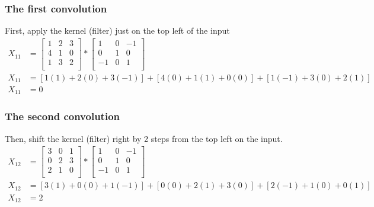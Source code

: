 \documentclass[12pt, a4paper]{article}
\begin{document}
                \subsubsection{The first convolution}
                    First, apply the kernel (filter) just on the top left of the input
                    \begin{align*}
                        {X}_{11} &=
                        \begin{bmatrix}
                            1 & 2 & 3 \\
                            4 & 1 & 0 \\
                            1 & 3 & 2 \\
                        \end{bmatrix}
                        \ast
                        \begin{bmatrix}
                            1  & 0 & -1 \\
                            0  & 1 & 0  \\
                            -1 & 0 & 1  \\
                        \end{bmatrix}
                        \\[1em]
                        {X}_{11} &= [1(1) + 2(0) + 3(-1)] + [4(0) + 1(1) + 0(0)] + [1(-1) + 3(0) + 2(1)] \\
                        {X}_{11} &= 0
                    \end{align*}

                \subsubsection{The second convolution}
                    Then, shift the kernel (filter) right by 2 steps from the top left on the input.
                    \begin{align*}
                        {X}_{12} &=
                        \begin{bmatrix}
                            3 & 0 & 1 \\
                            0 & 2 & 3 \\
                            2 & 1 & 0 \\
                        \end{bmatrix}
                        \ast
                        \begin{bmatrix}
                            1  & 0 & -1 \\
                            0  & 1 & 0  \\
                            -1 & 0 & 1  \\
                        \end{bmatrix}
                        \\[1em]
                        {X}_{12} &= [3(1) + 0(0) + 1(-1)] + [0(0) + 2(1) + 3(0)] + [2(-1) + 1(0) + 0(1)] \\
                        {X}_{12} &= 2
                    \end{align*}
\end{document}
